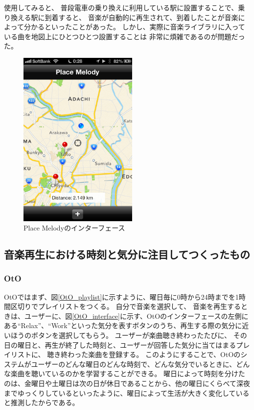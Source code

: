 \documentclass[11pt, onecolumn]{jsarticle}
\begin{document}
使用してみると、
普段電車の乗り換えに利用している駅に設置することで、乗り換える駅に到着すると、
音楽が自動的に再生されて、到着したことが音楽によって分かるといったことがあった。
しかし、実際に音楽ライブラリに入っている曲を地図上にひとつひとつ設置することは
非常に煩雑であるのが問題だった。

\begin{figure}[h]
\begin{center}
\includegraphics[width=5.866cm]{placeMelody.png}
\caption{Place Melodyのインターフェース}
\label{placeMelody_interface}
\end{center}
\end{figure}



\subsection{音楽再生における時刻と気分に注目してつくったもの}

\subsubsection{OtO}
OtOではまず、図\ref{OtO_playlist}に示すように、曜日毎に0時から24時までを1時間区切りでプレイリストをつくる。
自分で音楽を選択して、
音楽を再生するときは、ユーザーに、図\ref{OtO_interface}に示す、OtOのインターフェースの左側にある``Relax''、``Work''といった気分を表すボタンのうち、再生する際の気分に近いほうのボタンを選択してもらう。
ユーザーが楽曲聴き終わったたびに、
その日の曜日と、再生が終了した時刻と、ユーザーが回答した気分に当てはまるプレイリストに、
聴き終わった楽曲を登録する。
このようにすることで、OtOのシステムがユーザーのどんな曜日のどんな時刻で、どんな気分でいるときに、どんな楽曲を聴いているのかを学習することができる。
曜日によって時刻を分けたのは、金曜日や土曜日は次の日が休日であることから、他の曜日にくらべて深夜までゆっくりしているといったように、曜日によって生活が大きく変化していると推測したからである。
\end{document}
